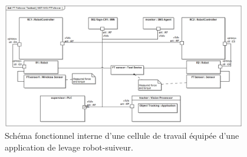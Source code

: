\documentclass[12pt]{article}
\begin{document}
\begin{figure}[!th]
	\centering
	\includegraphics[width=0.95\textwidth]{../chapter-conclusions/images/NIST-IWS-FTFollower}
	\caption{Schéma fonctionnel interne d'une cellule de travail équipée d'une application de levage robot-suiveur.}
	\label{fig:concl:lfscenario-full}
\end{figure}
%
%
%
%
%
\end{document}
